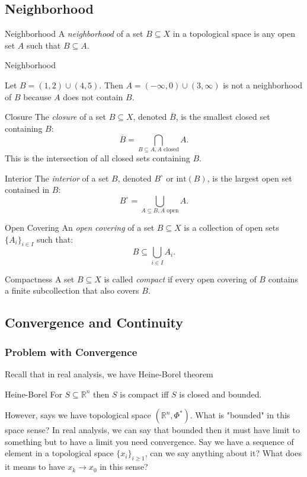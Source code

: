 \subsection{Neighborhood}
\begin{defbox}{Neighborhood}
A \textit{neighborhood} of a set $B \subseteq X$ in a topological space is any open set $A$ such that $B \subseteq A$.
\end{defbox}
\begin{exbox}{Neighborhood}

Let $B = (1, 2) \cup (4, 5)$. Then $A = (-\infty, 0) \cup (3, \infty)$ is not a neighborhood of $B$ because $A$ does not contain $B$.

\end{exbox}
\begin{defbox}{Closure}
The \textit{closure} of a set $B \subseteq X$, denoted $\overline{B}$, is the smallest closed set containing $B$:
\[
\overline{B} = \bigcap_{B \subseteq A, A \text{ closed}} A.
\]
This is the intersection of all closed sets containing $B$.
\end{defbox}
\begin{defbox}{Interior}
The \textit{interior} of a set $B$, denoted $B^\circ$ or $\text{int}(B)$, is the largest open set contained in $B$:
\[
B^\circ = \bigcup_{A \subseteq B, A \text{ open}} A.
\]
\end{defbox}
\begin{defbox}{Open Covering}
An \textit{open covering} of a set $B \subseteq X$ is a collection of open sets $\{A_i\}_{i \in I}$ such that:
\[
B \subseteq \bigcup_{i \in I} A_i.
\]
\end{defbox}
\begin{defbox}{Compactness}
A set $B \subseteq X$ is called \textit{compact} if every open covering of $B$ contains a finite subcollection that also covers $B$.
\end{defbox}
\subsection{Convergence and Continuity}
\subsubsection{Problem with Convergence}

Recall that in real analysis, we have Heine-Borel theorem
\begin{thmbox}{Heine-Borel}
For  $S\subseteq \mathbb{R}^n$ then $S$ is compact iff $S$ is closed and bounded.
\end{thmbox}
However, says we have topological space $(\mathbb{R}^n,\Phi^*)$. What is "bounded" in this space sense? In real analysis, we can say that bounded then it must have limit to something but to have a limit you need convergence. Say we have a sequence of element in a topological space $\{x_i\}_{i\geq 1}$, can we say anything about it? What does it means to have $x_k \rightarrow x_0$ in this sense?
